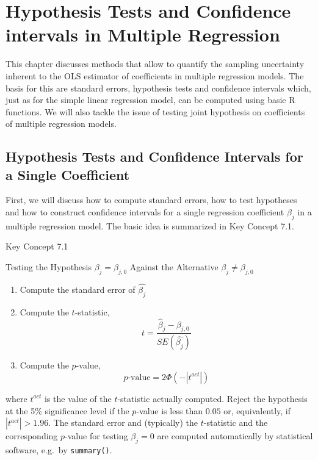 \documentclass[]{book}
\providecommand{\tightlist}{%
  \setlength{\itemsep}{0pt}\setlength{\parskip}{0pt}}
\theoremstyle{definition}
\theoremstyle{definition}
\theoremstyle{definition}
\theoremstyle{remark}
\begin{document}
\hypertarget{14f935020c5ef}{}

\chapter{Hypothesis Tests and Confidence intervals in Multiple
Regression}\label{hypothesis-tests-and-confidence-intervals-in-multiple-regression}

This chapter discusses methods that allow to quantify the sampling
uncertainty inherent to the OLS estimator of coefficients in multiple
regression models. The basis for this are standard errors, hypothesis
tests and confidence intervals which, just as for the simple linear
regression model, can be computed using basic R functions. We will also
tackle the issue of testing joint hypothesis on coefficients of multiple
regression models.

\section{Hypothesis Tests and Confidence Intervals for a Single
Coefficient}\label{hypothesis-tests-and-confidence-intervals-for-a-single-coefficient}

First, we will discuss how to compute standard errors, how to test
hypotheses and how to construct confidence intervals for a single
regression coefficient \(\beta_j\) in a multiple regression model. The
basic idea is summarized in Key Concept 7.1.

Key Concept 7.1

Testing the Hypothesis \(\beta_j = \beta_{j,0}\) Against the Alternative
\(\beta_j \neq \beta_{j,0}\)

\begin{enumerate}
\def\labelenumi{\arabic{enumi}.}
\tightlist
\item
  Compute the standard error of \(\hat{\beta_j}\)
\item
  Compute the \(t\)-statistic,
  \[t = \frac{\hat{\beta}_j - \beta_{j,0}} {SE(\hat{\beta_j})}\]
\item
  Compute the \(p\)-value, \[p\text{-value} = 2 \Phi(-|t^{act}|)\]
\end{enumerate}

where \(t^{act}\) is the value of the \(t\)-statistic actually computed.
Reject the hypothesis at the 5\% significance level if the \(p\)-value
is less than \(0.05\) or, equivalently, if \(|t^{act}| > 1.96\). The
standard error and (typically) the \(t\)-statistic and the corresponding
\(p\)-value for testing \(\beta_j = 0\) are computed automatically by
statistical software, e.g.~by \texttt{summary()}.
\end{document}
